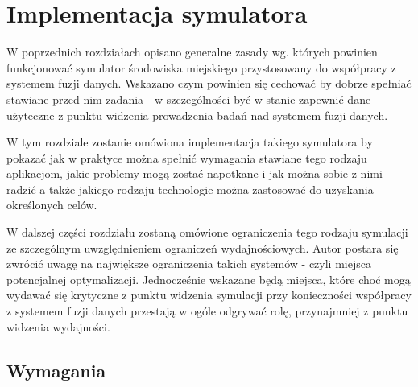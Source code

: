 \chapter{Implementacja symulatora}

\par{
W poprzednich rozdziałach opisano generalne zasady wg. których powinien funkcjonować symulator środowiska miejskiego przystosowany do współpracy z systemem fuzji danych. Wskazano czym powinien się cechować by dobrze spełniać stawiane przed nim zadania - w szczególności być w stanie zapewnić dane użyteczne z punktu widzenia prowadzenia badań nad systemem fuzji danych.
}
\par{
W tym rozdziale zostanie omówiona implementacja takiego symulatora by pokazać jak w praktyce można spełnić wymagania stawiane tego rodzaju aplikacjom, jakie problemy mogą zostać napotkane i jak można sobie z nimi radzić a także jakiego rodzaju technologie można zastosować do uzyskania określonych celów.
}
\par{
W dalszej części rozdziału zostaną omówione ograniczenia tego rodzaju symulacji ze szczególnym uwzględnieniem ograniczeń wydajnościowych. Autor postara się zwrócić uwagę na największe ograniczenia takich systemów - czyli miejsca potencjalnej optymalizacji. Jednocześnie wskazane będą miejsca, które choć mogą wydawać się krytyczne z punktu widzenia symulacji przy konieczności współpracy z systemem fuzji danych przestają w ogóle odgrywać rolę, przynajmniej z punktu widzenia wydajności.
}

\section[Wymagania][Wymagania]{Wymagania}


